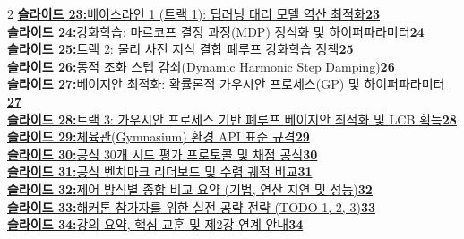 \documentclass[11pt,a4paper]{article}
\begin{document}
{\begin{multicols}{2}
\noindent\hyperlink{slide.23}{\textbf{\color{primaryblue}슬라이드 23:}\enspace 베이스라인 1 (트랙 1): 딥러닝 대리 모델 역산 최적화\enspace\dotfill\enspace\textbf{23}} \\[0.22em]
\noindent\hyperlink{slide.24}{\textbf{\color{primaryblue}슬라이드 24:}\enspace 강화학습: 마르코프 결정 과정(MDP) 정식화 및 하이퍼파라미터\enspace\dotfill\enspace\textbf{24}} \\[0.22em]
\noindent\hyperlink{slide.25}{\textbf{\color{primaryblue}슬라이드 25:}\enspace 트랙 2: 물리 사전 지식 결합 폐루프 강화학습 정책\enspace\dotfill\enspace\textbf{25}} \\[0.22em]
\noindent\hyperlink{slide.26}{\textbf{\color{primaryblue}슬라이드 26:}\enspace 동적 조화 스텝 감쇠(Dynamic Harmonic Step Damping)\enspace\dotfill\enspace\textbf{26}} \\[0.22em]
\noindent\hyperlink{slide.27}{\textbf{\color{primaryblue}슬라이드 27:}\enspace 베이지안 최적화: 확률론적 가우시안 프로세스(GP) 및 하이퍼파라미터\enspace\dotfill\enspace\textbf{27}} \\[0.22em]
\noindent\hyperlink{slide.28}{\textbf{\color{primaryblue}슬라이드 28:}\enspace 트랙 3: 가우시안 프로세스 기반 폐루프 베이지안 최적화 및 LCB 획득\enspace\dotfill\enspace\textbf{28}} \\[0.22em]
\noindent\hyperlink{slide.29}{\textbf{\color{primaryblue}슬라이드 29:}\enspace 체육관(Gymnasium) 환경 API 표준 규격\enspace\dotfill\enspace\textbf{29}} \\[0.22em]
\noindent\hyperlink{slide.30}{\textbf{\color{primaryblue}슬라이드 30:}\enspace 공식 30개 시드 평가 프로토콜 및 채점 공식\enspace\dotfill\enspace\textbf{30}} \\[0.22em]
\noindent\hyperlink{slide.31}{\textbf{\color{primaryblue}슬라이드 31:}\enspace 공식 벤치마크 리더보드 및 수렴 궤적 비교\enspace\dotfill\enspace\textbf{31}} \\[0.22em]
\noindent\hyperlink{slide.32}{\textbf{\color{primaryblue}슬라이드 32:}\enspace 제어 방식별 종합 비교 요약 (기법, 연산 지연 및 성능)\enspace\dotfill\enspace\textbf{32}} \\[0.22em]
\noindent\hyperlink{slide.33}{\textbf{\color{primaryblue}슬라이드 33:}\enspace 해커톤 참가자를 위한 실전 공략 전략 (TODO 1, 2, 3)\enspace\dotfill\enspace\textbf{33}} \\[0.22em]
\noindent\hyperlink{slide.34}{\textbf{\color{primaryblue}슬라이드 34:}\enspace 강의 요약, 핵심 교훈 및 제2강 연계 안내\enspace\dotfill\enspace\textbf{34}} \\[0.22em]
\end{multicols}}
\end{document}
